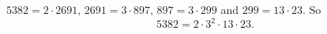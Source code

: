 $5382=2\cdot2691$, $2691=3\cdot897$, $897=3\cdot299$ and $299=13\cdot23$. So
\[5382=\boxed{2\cdot3^2\cdot13\cdot23}.\]
